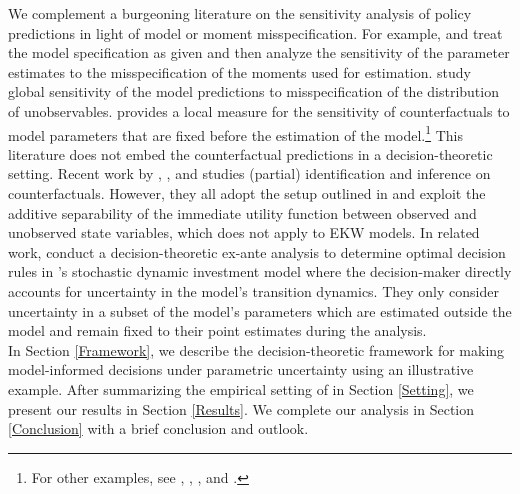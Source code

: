 \noindent We complement a burgeoning literature on the sensitivity analysis of policy predictions in light of model or moment misspecification. For example, \citet{Andrews.2017} and \citet{Andrews.2020} treat the model specification as given and then analyze the sensitivity of the parameter estimates to the misspecification of the moments used for estimation. \citet{Christensen.2019} study global sensitivity of the model predictions to misspecification of the distribution of unobservables. \citet{Jorgensen.2021} provides a local measure for the sensitivity of counterfactuals to model parameters that are fixed before the estimation of the model.\footnote{For other examples, see \citet{Armstrong.2021}, \citet{Bonhomme.2021}, \citet{Bugni.2019}, and \citet{Mukhin.2018}.} This literature does not embed the counterfactual predictions in a decision-theoretic setting. Recent work by \citet{Kalouptsidi.2021a}, \citet{Kalouptsidi.2021}, and \citet{Norets.2014} studies (partial) identification and inference on counterfactuals. However, they all adopt the setup outlined in \citet{Rust.1987} and exploit the additive separability of the immediate utility function between observed and unobserved state variables, which does not apply to EKW models. In related work, \citet{Blesch.2021} conduct a decision-theoretic ex-ante analysis to determine optimal decision rules in \citet{Rust.1987}'s stochastic dynamic investment model where the decision-maker directly accounts for uncertainty in the model's transition dynamics. They only consider uncertainty in a subset of the model's parameters which are estimated outside the model and remain fixed to their point estimates during the analysis.\\

\noindent In Section \ref{Framework}, we describe the decision-theoretic framework for making model-informed decisions under parametric uncertainty using an illustrative example. After summarizing the empirical setting of \citet{Keane.1997} in Section \ref{Setting}, we present our results in Section \ref{Results}.  We complete our analysis in Section \ref{Conclusion} with a brief conclusion and outlook.
